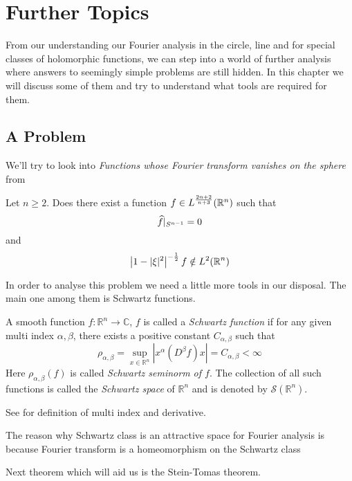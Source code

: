 
\chapter{Further Topics}

From our understanding our Fourier analysis in the circle, line and for special classes of holomorphic functions, we can step into a world of further analysis where answers to seemingly simple problems are still hidden. In this chapter we will discuss some of them and try to understand what tools are required for them.

\section{A Problem}
We'll try to look into \emph{Functions whose Fourier transform vanishes on the sphere} from \autocite[Problem no. 3]{Grafakos2017a}

\begin{problem}
\label{prb:research_problem}
Let $n \ge 2$. Does there exist a function $f \in L^{\frac{2n+2}{n+3}}(\mathbb R^n)$ such that $$\widehat{f}\vert_{S^{n-1}} = 0$$
and 
$$\left| 1 - |\xi|^2\right|^{-\frac{1}{2}}f \notin L^2(\mathbb R^n)$$
\end{problem}

In order to analyse this problem we need a little more tools in our disposal. The main one among them is Schwartz functions. 

\begin{definition}
\label{def:schwartz_class}
A smooth function $f:\mathbb{R}^n \to \mathbb{C}$, $f$ is called a \emph{Schwartz function} if for any given multi index $\alpha, \beta$, there exists a positive constant $C_{\alpha, \beta}$ such that $$\rho_{\alpha, \beta} = \sup_{x \in \mathbb{R}^n} \left|x^\alpha (D^\beta f)x \right| = C_{\alpha, \beta} < \infty$$ 
Here $\rho_{\alpha, \beta}(f)$ is called \emph{Schwartz seminorm of $f$}. The collection of all such functions is called the \emph{Schwartz space} of $\mathbb{R}^n$ and is denoted by $\mathscr{S}(\mathbb{R}^n)$. 

See \autocite[Appendix A.3]{perko_differential_2001} for definition of multi index and derivative.
\end{definition}

The reason why Schwartz class is an attractive space for Fourier analysis is because Fourier transform is a homeomorphism on the Schwartz class \autocite[Corollary 2.2.15]{Grafakos_Classical_Fourier}

Next theorem which will aid us is the Stein-Tomas theorem. 
